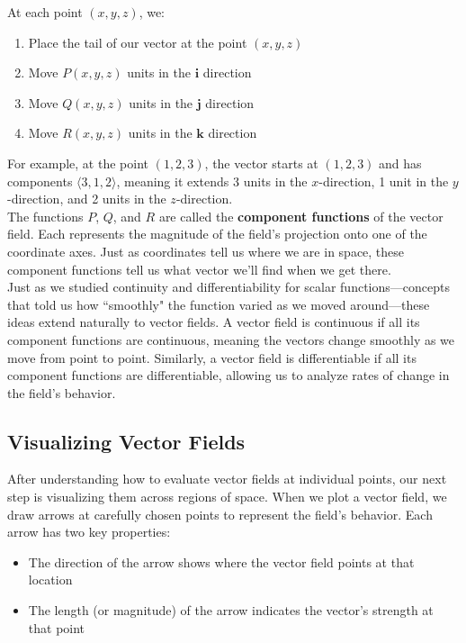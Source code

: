 \noindent At each point $(x,y,z)$, we:
\begin{enumerate}
   \item Place the tail of our vector at the point $(x,y,z)$
   \item Move $P(x,y,z)$ units in the $\mathbf{i}$ direction
   \item Move $Q(x,y,z)$ units in the $\mathbf{j}$ direction
   \item Move $R(x,y,z)$ units in the $\mathbf{k}$ direction
\end{enumerate}

\noindent For example, at the point $(1,2,3)$, the vector starts at $(1,2,3)$ and has components $\langle 3,1,2 \rangle$, meaning it extends 3 units in the $x$-direction, 1 unit in the $y$-direction, and 2 units in the $z$-direction. \\

\noindent The functions $P$, $Q$, and $R$ are called the \textbf{component functions} of the vector field. Each represents the magnitude of the field's projection onto one of the coordinate axes. Just as coordinates tell us where we are in space, these component functions tell us what vector we'll find when we get there. \\

\noindent Just as we studied continuity and differentiability for scalar functions—concepts that told us how ``smoothly" the function varied as we moved around—these ideas extend naturally to vector fields. A vector field is continuous if all its component functions are continuous, meaning the vectors change smoothly as we move from point to point. Similarly, a vector field is differentiable if all its component functions are differentiable, allowing us to analyze rates of change in the field's behavior.


\subsection*{Visualizing Vector Fields}

\noindent After understanding how to evaluate vector fields at individual points, our next step is visualizing them across regions of space. When we plot a vector field, we draw arrows at carefully chosen points to represent the field's behavior. Each arrow has two key properties:
\begin{itemize}
   \item The direction of the arrow shows where the vector field points at that location
   \item The length (or magnitude) of the arrow indicates the vector's strength at that point
\end{itemize}


